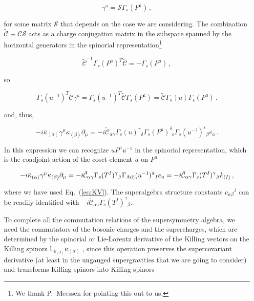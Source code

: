 \documentclass[12pt,a4paper]{article}
\begin{document}
\begin{equation}
\gamma^{a}=\mathcal{S}\Gamma_{s}(P^{a})\, ,  
\end{equation}

\noindent 
for some matrix $\mathcal{S}$ that depends on the case we are
considering.  The combination
$\tilde{\mathcal{C}}\equiv\mathcal{C}\mathcal{S}$ acts as a charge
conjugation matrix in the subspace spanned by the horizontal
generators in the spinorial representation\footnote{We thank
  P.~Meessen for pointing this out to us.} 

\begin{equation}
\tilde{\mathcal{C}}^{-1}\Gamma_{s}(P^{a})^{T}\tilde{\mathcal{C}}
= -\Gamma_{s}(P^{a})\, ,
\end{equation}

\noindent
so 

\begin{equation}
\Gamma_{s}(u^{-1})^{T}\mathcal{C}\gamma^{a}=   
\Gamma_{s}(u^{-1})^{T}\tilde{\mathcal{C}}\Gamma_{s}(P^{a})=
\tilde{\mathcal{C}}\Gamma_{s}(u)\Gamma_{s}(P^{a})\, .
\end{equation}

\noindent
and, thus, 

\begin{equation}
-i\bar{\kappa}_{(\alpha)}\gamma^{\mu}\kappa_{(\beta)}\partial_{\mu} = 
-i\tilde{\mathcal{C}}_{\alpha\gamma}\Gamma_{s}(u)^{\gamma}{}_{\delta} 
\Gamma_{s}(P^{a})^{\delta}{}_{\epsilon}  
\Gamma_{s}(u^{-1})^{\epsilon}{}_{\beta}e_{a}\, .
\end{equation}

In this expression we can recognize $uP^{a}u^{-1}$ in the spinorial
representation, which is the coadjoint action of the coset element $u$
on $P^{a}$

\begin{equation}
-i\bar{\kappa}_{(\alpha)}\gamma^{\mu}\kappa_{(\beta)}\partial_{\mu} = 
-i\tilde{\mathcal{C}}_{\alpha\gamma}  \Gamma_{s}(T^{I})^{\gamma}{}_{\beta} 
\Gamma_{\rm Adj}(u^{-1})^{a}{}_{I} e_{a} =  
-i\tilde{\mathcal{C}}_{\alpha\gamma}  \Gamma_{s}(T^{I})^{\gamma}{}_{\beta}
k_{(I)}\, , 
\end{equation}

\noindent
where we have used Eq.~(\ref{eq:KV}). The superalgebra structure
constants $c_{\alpha\beta}{}^{I}$ can be readily identified with
$-i\tilde{\mathcal{C}}_{\alpha\gamma}
\Gamma_{s}(T^{I})^{\gamma}{}_{\beta}$.

To complete all the commutation relations of the supersymmetry
algebra, we need the commutators of the bosonic charges and the
supercharges, which are determined by the spinorial or Lie-Lorentz
derivative of the Killing vectors on the Killing spinors
$\mathbb{L}_{k_{(I)}}\kappa_{(\alpha)}$
\cite{Figueroa-O'Farrill:1999va,Ortin:2002qb}, since this operation
preserves the supercovariant derivative (at least in the ungauged
supergravities that we are going to consider) and transforms Killing
spinors into Killing spinors
\end{document}
